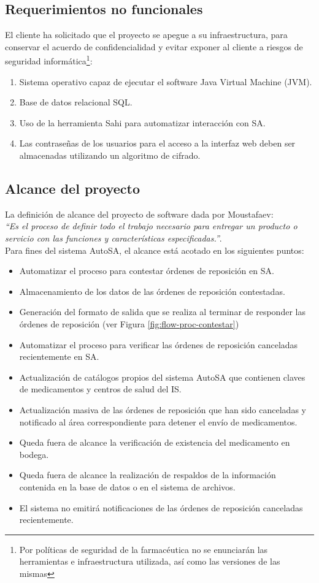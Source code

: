 \subsection{Requerimientos no funcionales}\label{sec:nonfunctional-req}
El cliente ha solicitado que el proyecto se apegue a su infraestructura, para conservar el acuerdo de confidencialidad y evitar exponer al cliente a riesgos de seguridad informática\footnote{Por políticas de seguridad de la farmacéutica no se enunciarán las herramientas e infraestructura utilizada, así como las versiones de las mismas}:
\begin{enumerate}
\item Sistema operativo capaz de ejecutar el software Java Virtual Machine (JVM).
\item Base de datos relacional SQL.
\item Uso de la herramienta Sahi para automatizar interacción con SA.
\item Las contraseñas de los usuarios para el acceso a la interfaz web deben ser almacenadas utilizando un algoritmo de cifrado.
\end{enumerate}


\subsection{Alcance del proyecto}
La definición de alcance del proyecto de software dada por Moustafaev:\\
\textit{``Es el proceso de definir todo el trabajo necesario para entregar un producto o servicio con las funciones y características especificadas.''}\cite{ScopeManagement}.\\
Para fines del sistema AutoSA, el alcance está acotado en los siguientes puntos:
\begin{itemize}
\item Automatizar el proceso para contestar órdenes de reposición en SA.
\item Almacenamiento de los datos de las órdenes de reposición contestadas.
\item Generación del formato de salida que se realiza al terminar de responder las órdenes de reposición (ver Figura \ref{fig:flow-proc-contestar})
\item Automatizar el proceso para verificar las órdenes de reposición canceladas recientemente en SA.
\item Actualización de catálogos propios del sistema AutoSA que contienen claves de medicamentos y centros de salud del IS.
\item Actualización masiva de las órdenes de reposición que han sido canceladas y notificado al área correspondiente para detener el envío de medicamentos.
\item Queda fuera de alcance la verificación de existencia del medicamento en bodega.
\item Queda fuera de alcance la realización de respaldos de la información contenida en la base de datos o en el sistema de archivos.
\item El sistema no emitirá notificaciones de las órdenes de reposición canceladas recientemente.
\end{itemize}


